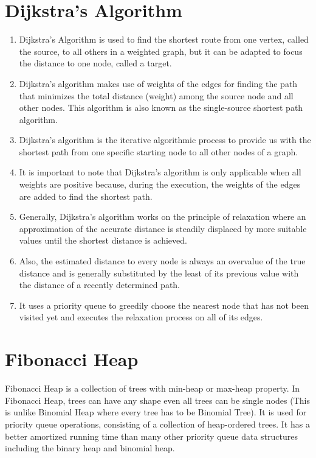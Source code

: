 \documentclass{article}
\begin{document}
\section{Dijkstra’s Algorithm }
\begin{enumerate}
\item Dijkstra's Algorithm is used to find the shortest route from one vertex, called the source, to all others in a weighted graph, but it can be adapted to focus the distance to one node, called a target.
\item Dijkstra's algorithm makes use of weights of the edges for finding the path that minimizes the total distance (weight) among the source node and all other nodes. This algorithm is also known as the single-source shortest path algorithm.
\item Dijkstra’s algorithm is the iterative algorithmic process to provide us with the shortest path from one specific starting node to all other nodes of a graph.
\item It is important to note that Dijkstra’s algorithm is only applicable when all weights are positive because, during the execution, the weights of the edges are added to find the shortest path.
\item Generally, Dijkstra’s algorithm works on the principle of relaxation where an approximation of the accurate distance is steadily displaced by more suitable values until the shortest distance is achieved.
\item Also, the estimated distance to every node is always an overvalue of the true distance and is generally substituted by the least of its previous value with the distance of a recently determined path. 
\item It uses a priority queue to greedily choose the nearest node that has not been visited yet and executes the relaxation process on all of its edges.
\end{enumerate}

\section{Fibonacci Heap}
Fibonacci Heap is a collection of trees with min-heap or max-heap property. In Fibonacci Heap, trees can have any shape even all trees can be single nodes (This is unlike Binomial Heap where every tree has to be Binomial Tree). It is used for priority queue operations, consisting of a collection of heap-ordered trees. It has a better amortized running time than many other priority queue data structures including the binary heap and binomial heap.
\end{document}
